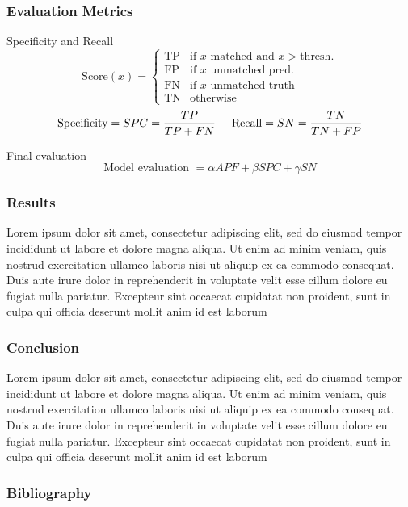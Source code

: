 \documentclass[10pt]{beamer}
\begin{document}
\begin{frame}
  \frametitle{Evaluation Metrics}
  \begin{block}{Specificity and Recall}
    \[
    \text{Score}(x) = 
    \begin{cases} 
      \text{TP} & \text{if }x \text{ matched and } x > \text{thresh.} \\
      \text{FP} & \text{if }x \text{ unmatched pred.} \\
      \text{FN} & \text{if }x \text{ unmatched truth} \\
      \text{TN} & \text{otherwise}
    \end{cases}
    \]
    \begin{equation*}
      \text{Specificity} = SPC = \frac{TP}{TP+FN} \hspace{5mm} \text{Recall} = SN = \frac{TN}{TN+FP}
    \end{equation*}
  \end{block}
  \begin{block}{Final evaluation}
    \begin{equation*}
      \text{Model evaluation } = \alpha APF + \beta SPC + \gamma SN 
    \end{equation*}
  \end{block}
\end{frame}


\begin{frame}
  \frametitle{Results}
  \begin{block}{}
    Lorem ipsum dolor sit amet, consectetur adipiscing elit, sed do eiusmod tempor incididunt ut labore et dolore magna aliqua. Ut enim ad minim veniam, quis nostrud exercitation ullamco laboris nisi ut aliquip ex ea commodo consequat. Duis aute irure dolor in reprehenderit in voluptate velit esse cillum dolore eu fugiat nulla pariatur. Excepteur sint occaecat cupidatat non proident, sunt in culpa qui officia deserunt mollit anim id est laborum
  \end{block} 
\end{frame}


\begin{frame}
  \frametitle{Conclusion}
  \begin{block}{}
    Lorem ipsum dolor sit amet, consectetur adipiscing elit, sed do eiusmod tempor incididunt ut labore et dolore magna aliqua. Ut enim ad minim veniam, quis nostrud exercitation ullamco laboris nisi ut aliquip ex ea commodo consequat. Duis aute irure dolor in reprehenderit in voluptate velit esse cillum dolore eu fugiat nulla pariatur. Excepteur sint occaecat cupidatat non proident, sunt in culpa qui officia deserunt mollit anim id est laborum
  \end{block} 
\end{frame}


\begin{frame}
  \frametitle{Bibliography}
  \begin{block}{}
    {
        \small
    }
  \end{block} 
\end{frame}
\end{document}
